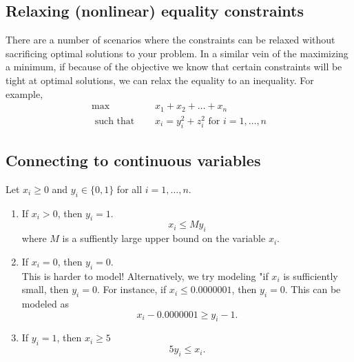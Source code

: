 {\subsection{Relaxing (nonlinear) equality constraints}

There are a number of scenarios where the constraints can be relaxed without sacrificing optimal solutions to your problem.   In a similar vein of the maximizing a minimum, if because of the objective we know that certain constraints will be tight at optimal solutions, we can relax the equality to an inequality.   For example, 
\begin{align*}
\max   \quad &x_1 + x_2 +  \dots + x_n\\
\text{ such that } \quad &  x_i = y_i^2 + z_i^2 \text{ for } i=1, \dots, n
\end{align*}







\subsection{Connecting to continuous variables}

Let $x_i \geq 0$ and $y_i \in \{0,1\}$ for all $i=1, \dots, n$.

\begin{enumerate}
\item If $x_i > 0$, then $y_i = 1$.
\begin{equation}
x_i \leq M y_i
\end{equation}
where $M$ is a suffiently large upper bound on the variable $x_i$.
\item If $x_i = 0$, then $y_i = 0$.\\
This is harder to model!  Alternatively, we try modeling "if $x_i$ is sufficiently small, then $y_i = 0$.   For instance, if $x_i \leq 0.0000001$, then $y_i = 0$.
This can be modeled as
\begin{equation}
x_i - 0.0000001 \geq y_i -1.
\end{equation}
\item If $y_i = 1$, then $x_i \geq 5$
\begin{equation}
5y_i \leq x_i.
\end{equation}
\end{enumerate}

}
